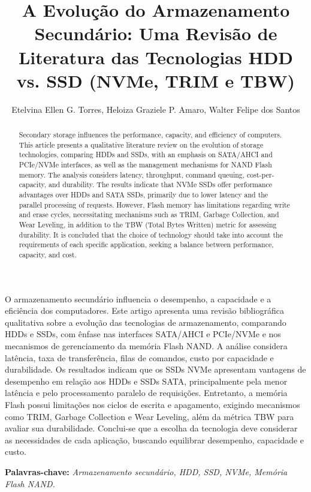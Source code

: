 \documentclass[12pt]{article}
\title{A Evolução do Armazenamento Secundário: Uma Revisão de Literatura das Tecnologias HDD vs. SSD (NVMe, TRIM e TBW)}
\author{Etelvina Ellen G. Torres\inst{1}, Heloiza Graziele P. Amaro\inst{1}, Walter Felipe dos Santos\inst{1}}
\begin{document}
 

\maketitle
     
\begin{resumo} 
 O armazenamento secundário influencia o desempenho, a capacidade e a eficiência dos computadores. Este artigo apresenta uma revisão bibliográfica qualitativa sobre a evolução das tecnologias de armazenamento, comparando HDDs e SSDs, com ênfase nas interfaces SATA/AHCI e PCIe/NVMe e nos mecanismos de gerenciamento da memória Flash NAND. A análise considera latência, taxa de transferência, filas de comandos, custo por capacidade e durabilidade. Os resultados indicam que os SSDs NVMe apresentam vantagens de desempenho em relação aos HDDs e SSDs SATA, principalmente pela menor latência e pelo processamento paralelo de requisições. Entretanto, a memória Flash possui limitações nos ciclos de escrita e apagamento, exigindo mecanismos como TRIM, Garbage Collection e Wear Leveling, além da métrica TBW para avaliar sua durabilidade. Conclui-se que a escolha da tecnologia deve considerar as necessidades de cada aplicação, buscando equilibrar desempenho, capacidade e custo.

\end{resumo}
\par
{\setlength{\leftskip}{0.7cm}
\noindent\textbf{Palavras-chave:} \textit{Armazenamento secundário, HDD, SSD, NVMe, Memória \\
Flash NAND.}\par}

\begin{abstract}
Secondary storage influences the performance, capacity, and efficiency of computers. This article presents a qualitative literature review on the evolution of storage technologies, comparing HDDs and SSDs, with an emphasis on SATA/AHCI and PCIe/NVMe interfaces, as well as the management mechanisms for NAND Flash memory. The analysis considers latency, throughput, command queuing, cost-per-capacity, and durability. The results indicate that NVMe SSDs offer performance advantages over HDDs and SATA SSDs, primarily due to lower latency and the parallel processing of requests. However, Flash memory has limitations regarding write and erase cycles, necessitating mechanisms such as TRIM, Garbage Collection, and Wear Leveling, in addition to the TBW (Total Bytes Written) metric for assessing durability. It is concluded that the choice of technology should take into account the requirements of each specific application, seeking a balance between performance, capacity, and cost.

\end{abstract}
\end{document}
